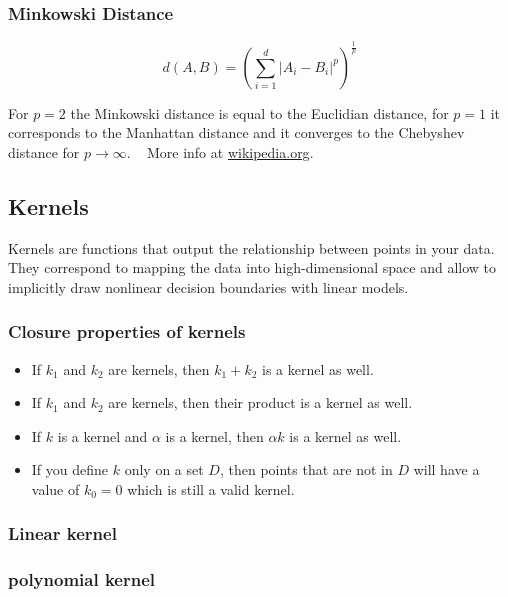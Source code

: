 \documentclass[
]{book}
\begin{document}
\hypertarget{minkowski-distance}{%
\subsubsection{Minkowski Distance}\label{minkowski-distance}}

\[d(A, B) = (\sum_{i=1}^d |A_i-B_i|^p)^\frac{1}{p} \]

For \(p=2\) the Minkowski distance is equal to the Euclidian distance, for
\(p=1\) it corresponds to the Manhattan distance and it converges to the
Chebyshev distance for \(p \to \infty\). ~ More info at
\href{https://en.wikipedia.org/wiki/Minkowski_distance}{wikipedia.org}.

\hypertarget{kernels}{%
\subsection{Kernels}\label{kernels}}

Kernels are functions that output the relationship between points in
your data. They correspond to mapping the data into high-dimensional
space and allow to implicitly draw nonlinear decision boundaries with
linear models.

\hypertarget{closure-properties-of-kernels}{%
\subsubsection{Closure properties of kernels}\label{closure-properties-of-kernels}}

\begin{itemize}
\item
  If \(k_1\) and \(k_2\) are kernels, then \(k_1 + k_2\) is a kernel as
  well.
\item
  If \(k_1\) and \(k_2\) are kernels, then their product is a kernel as
  well.
\item
  If \(k\) is a kernel and \(\alpha\) is a kernel, then \(\alpha k\) is a
  kernel as well.
\item
  If you define \(k\) only on a set \(D\), then points that are not in \(D\)
  will have a value of \(k_0=0\) which is still a valid kernel.
\end{itemize}

\hypertarget{linear-kernel}{%
\subsubsection{Linear kernel}\label{linear-kernel}}

\hypertarget{polynomial-kernel}{%
\subsubsection{polynomial kernel}\label{polynomial-kernel}}
\end{document}
